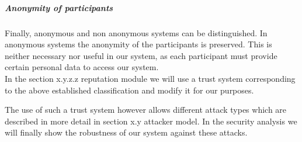\subparagraph{Anonymity of participants} Finally, anonymous and non anonymous systems can be distinguished. In anonymous systems the anonymity of the participants is preserved. This is neither necessary nor useful in our system, as each participant must provide certain personal data to access our system. \\

In the section x.y.z.z reputation module we will use a trust system corresponding to the above established classification and modify it for our purposes.

The use of such a trust system however allows different attack types which are described in more detail in section x.y attacker model. In the security analysis we will finally show the robustness of our system against these attacks.
